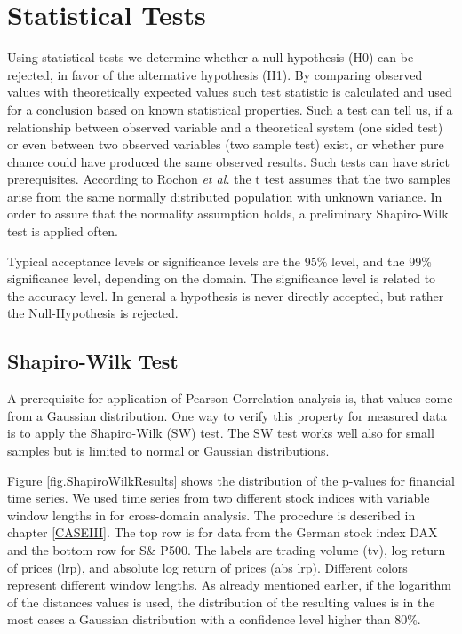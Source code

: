 \documentclass[a4paper,10pt]{scrbook}
\begin{document}
\clearpage

\section{Statistical Tests}
Using statistical tests we determine whether a null hypothesis (H0) can be rejected, in favor of the alternative hypothesis (H1). By comparing observed values with theoretically expected values such test statistic is calculated and used for a conclusion based on known statistical properties. Such a test can tell us, if a relationship between observed variable and a theoretical system (one sided test) or even between two observed variables (two sample test) exist, or whether pure chance could have produced the same observed results. Such tests can have strict prerequisites. According to Rochon \textit{et al.} \cite{Rochon} the t test assumes that the two samples arise from the same normally distributed population with unknown variance. In order to assure that the normality assumption holds, a preliminary Shapiro-Wilk test is applied often. 


Typical acceptance levels or significance levels are the 95$\%$ level, and the 99$\%$ significance level, depending on the domain. The significance level is related to the accuracy level. In general a hypothesis is never directly accepted, but rather the Null-Hypothesis is rejected. 

\subsection{Shapiro-Wilk Test}

A prerequisite for application of Pearson-Correlation analysis is, that values come from a Gaussian distribution. One way to verify this property for measured data is to apply the Shapiro-Wilk (SW) test. The SW test works well also for small samples but is limited to normal or Gaussian distributions. 

Figure \ref{fig.ShapiroWilkResults} shows the distribution of the p-values for financial time series. We used time series from two different stock indices with variable window lengths in for cross-domain analysis. The procedure is described in chapter \ref{CASEIII}. The top row is for data from the German stock index DAX and the bottom row for S\& P500. The labels are trading volume (tv), log return of prices (lrp), and absolute log return of prices (abs lrp). Different colors represent different window lengths. As already mentioned earlier, if the logarithm of the distances values is used, the distribution of the resulting values is in the most cases a Gaussian distribution with a confidence level higher than $80\%$.
\end{document}
